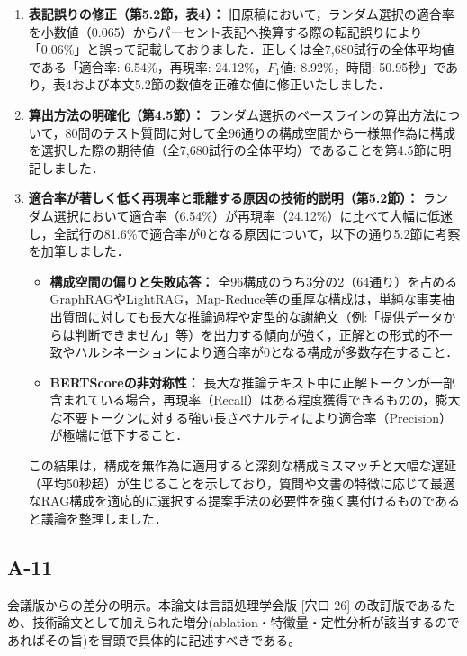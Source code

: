 \documentclass{jsarticle}
\begin{document}
\begin{enumerate}
\item \textbf{表記誤りの修正（第5.2節，表4）：}
旧原稿において，ランダム選択の適合率を小数値（0.065）からパーセント表記へ換算する際の転記誤りにより「0.06\%」と誤って記載しておりました．正しくは全7,680試行の全体平均値である「適合率: 6.54\%，再現率: 24.12\%，$F_1$値: 8.92\%，時間: 50.95秒」であり，表4および本文5.2節の数値を正確な値に修正いたしました．

\item \textbf{算出方法の明確化（第4.5節）：}
ランダム選択のベースラインの算出方法について，80問のテスト質問に対して全96通りの構成空間から一様無作為に構成を選択した際の期待値（全7,680試行の全体平均）であることを第4.5節に明記しました．

\item \textbf{適合率が著しく低く再現率と乖離する原因の技術的説明（第5.2節）：}
ランダム選択において適合率（6.54\%）が再現率（24.12\%）に比べて大幅に低迷し，全試行の81.6\%で適合率が0となる原因について，以下の通り5.2節に考察を加筆しました．
\begin{itemize}
\item \textbf{構成空間の偏りと失敗応答：} 全96構成のうち3分の2（64通り）を占めるGraphRAGやLightRAG，Map-Reduce等の重厚な構成は，単純な事実抽出質問に対しても長大な推論過程や定型的な謝絶文（例:「提供データからは判断できません」等）を出力する傾向が強く，正解との形式的不一致やハルシネーションにより適合率が0となる構成が多数存在すること．
\item \textbf{BERTScoreの非対称性：} 長大な推論テキスト中に正解トークンが一部含まれている場合，再現率（Recall）はある程度獲得できるものの，膨大な不要トークンに対する強い長さペナルティにより適合率（Precision）が極端に低下すること．
\end{itemize}
この結果は，構成を無作為に適用すると深刻な構成ミスマッチと大幅な遅延（平均50秒超）が生じることを示しており，質問や文書の特徴に応じて最適なRAG構成を適応的に選択する提案手法の必要性を強く裏付けるものであると議論を整理しました．
\end{enumerate}
\subsection*{A-11}
\begin{screen}
会議版からの差分の明示。本論文は言語処理学会版 [穴口 26] の改訂版であるため、技術論文として加えられた増分(ablation・特徴量・定性分析が該当するのであればその旨)を冒頭で具体的に記述すべきである。
\end{screen}
\end{document}
